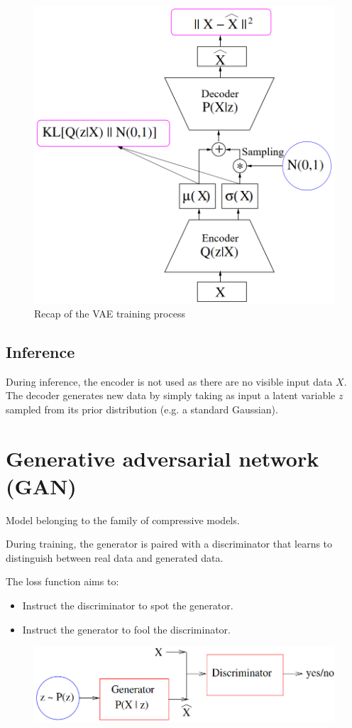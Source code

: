 \begin{figure}[H]
    \centering
    \includegraphics[width=0.4\linewidth]{./img/vae_training.png}
    \caption{Recap of the VAE training process}
\end{figure}



\subsection{Inference}

During inference, the encoder is not used as there are no visible input data $X$.
The decoder generates new data by simply taking as input a latent variable $z$ sampled from its prior distribution (e.g. a standard Gaussian).



\section{Generative adversarial network (GAN)}

Model belonging to the family of compressive models.

During training, the generator is paired with a discriminator that learns to distinguish between real data and generated data.

The loss function aims to:
\begin{itemize}
    \item Instruct the discriminator to spot the generator.
    \item Instruct the generator to fool the discriminator.
\end{itemize}

\begin{figure}[H]
    \centering
    \includegraphics[width=0.5\linewidth]{./img/gan.png}
\end{figure}



